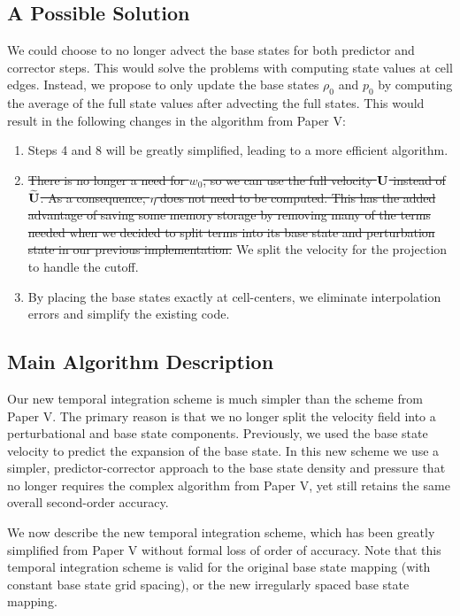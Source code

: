 \documentclass{aastex62}
\newcommand{\Ub}{{\bf{U}}}
\newcommand{\Ubt}{\widetilde{\Ub}}
\begin{document}
\subsection{A Possible Solution}
We could choose to no longer advect the base states for both predictor and corrector steps. This would solve the problems with computing state values at cell edges. Instead, we propose to only update the base states $\rho_0$ and $p_0$ by computing the average of the full state values after advecting the full states. This would result in the following changes in the algorithm from Paper V:
%
\begin{enumerate}
\item Steps 4 and 8 will be greatly simplified, leading to a more efficient algorithm.
\item \sout{There is no longer a need for $w_0$, so we can use the full velocity $\Ub$ instead of $\Ubt$. As a consequence, $\eta$ does not need to be computed. This has the added advantage of saving some memory storage by removing many of the terms needed when we decided to split terms into its base state and perturbation state in our previous implementation.} We split the velocity for the projection to handle the cutoff.
\item By placing the base states exactly at cell-centers, we eliminate interpolation errors and simplify the existing code.
\end{enumerate}
%

\subsection{Main Algorithm Description}\label{Sec:Main Algorithm Description}
Our new temporal integration scheme is much simpler than the scheme from Paper V.
The primary reason is that we no longer split the velocity field into a perturbational and base state components.  
Previously, we used the base state velocity to predict the expansion of the base state.  
In this new scheme we use a simpler, predictor-corrector approach to the base state density and pressure that no longer requires the complex algorithm from Paper V, yet still retains the same overall second-order accuracy.

We now describe the new temporal integration scheme, which has been greatly simplified
from Paper V without formal loss of order of accuracy.
Note that this temporal integration scheme is valid for the original base state mapping (with constant base state grid spacing), or the new irregularly spaced base state mapping.
\end{document}
